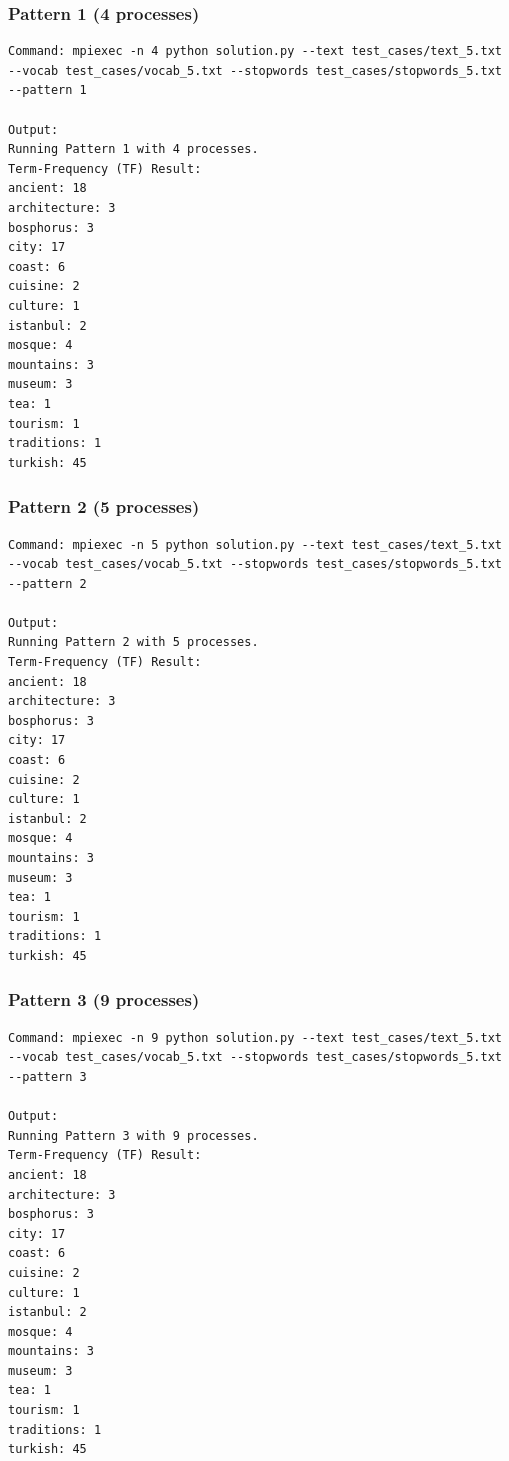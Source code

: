 \documentclass[12pt,a4paper]{article}
\begin{document}
\subsubsection{Pattern 1 (4 processes)}
\begin{lstlisting}
Command: mpiexec -n 4 python solution.py --text test_cases/text_5.txt --vocab test_cases/vocab_5.txt --stopwords test_cases/stopwords_5.txt --pattern 1

Output:
Running Pattern 1 with 4 processes.
Term-Frequency (TF) Result:
ancient: 18
architecture: 3
bosphorus: 3
city: 17
coast: 6
cuisine: 2
culture: 1
istanbul: 2
mosque: 4
mountains: 3
museum: 3
tea: 1
tourism: 1
traditions: 1
turkish: 45
\end{lstlisting}

\subsubsection{Pattern 2 (5 processes)}
\begin{lstlisting}
Command: mpiexec -n 5 python solution.py --text test_cases/text_5.txt --vocab test_cases/vocab_5.txt --stopwords test_cases/stopwords_5.txt --pattern 2

Output:
Running Pattern 2 with 5 processes.
Term-Frequency (TF) Result:
ancient: 18
architecture: 3
bosphorus: 3
city: 17
coast: 6
cuisine: 2
culture: 1
istanbul: 2
mosque: 4
mountains: 3
museum: 3
tea: 1
tourism: 1
traditions: 1
turkish: 45
\end{lstlisting}

\subsubsection{Pattern 3 (9 processes)}
\begin{lstlisting}
Command: mpiexec -n 9 python solution.py --text test_cases/text_5.txt --vocab test_cases/vocab_5.txt --stopwords test_cases/stopwords_5.txt --pattern 3

Output:
Running Pattern 3 with 9 processes.
Term-Frequency (TF) Result:
ancient: 18
architecture: 3
bosphorus: 3
city: 17
coast: 6
cuisine: 2
culture: 1
istanbul: 2
mosque: 4
mountains: 3
museum: 3
tea: 1
tourism: 1
traditions: 1
turkish: 45
\end{lstlisting}
\end{document}
